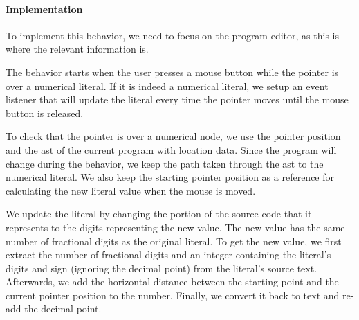 \paragraph{Implementation}
To implement this behavior, we need to focus on the program editor, as this is where the relevant information is.

The behavior starts when the user presses a mouse button while the pointer is over a numerical literal.
If it is indeed a numerical literal, we setup an event listener that will update the literal every time the pointer moves until the mouse button is released.

To check that the pointer is over a numerical node, we use the pointer position and the \gls{ast} of the current program with location data.
Since the program will change during the behavior, we keep the path taken through the \gls{ast} to the numerical literal.
We also keep the starting pointer position as a reference for calculating the new literal value when the mouse is moved.

We update the literal by changing the portion of the source code that it represents to the digits representing the new value.
The new value has the same number of fractional digits as the original literal.
To get the new value, we first extract the number of fractional digits and an integer containing the literal's digits and sign (ignoring the decimal point) from the literal's source text.
Afterwards, we add the horizontal distance between the starting point and the current pointer position to the number.
Finally, we convert it back to text and re-add the decimal point.

